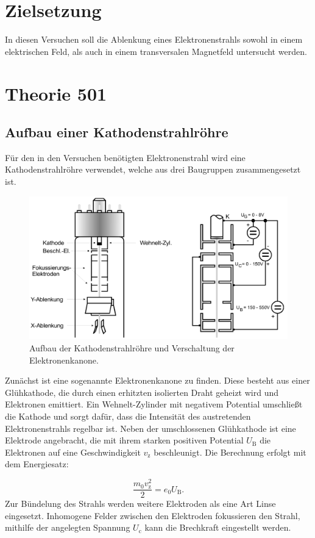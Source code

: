 \section{Zielsetzung}
In diesen Versuchen soll die Ablenkung eines Elektronenstrahls sowohl in einem elektrischen Feld, als auch in einem transversalen Magnetfeld untersucht werden.

\section{Theorie 501}
\subsection{Aufbau einer Kathodenstrahlröhre}
Für den in den Versuchen benötigten Elektronenstrahl wird eine Kathodenstrahlröhre verwendet, welche aus drei Baugruppen zusammengesetzt ist.

\begin{figure}[h!]
	\centering
	\includegraphics[width=0.9\linewidth]{kathodeaufbau.png}
	\caption{Aufbau der Kathodenstrahlröhre und Verschaltung der Elektronenkanone.}
	\label{fig:kathodeaufbau}
\end{figure}

Zunächst ist eine sogenannte Elektronenkanone zu finden. Diese besteht aus einer Glühkathode, die durch einen erhitzten isolierten Draht geheizt wird und Elektronen emittiert. Ein Wehnelt-Zylinder mit negativem
Potential umschließt die Kathode und sorgt dafür, dass die Intensität des austretenden Elektronenstrahls regelbar ist. Neben der umschlossenen Glühkathode ist eine Elektrode
angebracht, die mit ihrem starken positiven Potential $U_{\text{B}}$ die Elektronen auf eine Geschwindigkeit $v_{\text{z}}$ beschleunigt. Die Berechnung erfolgt mit dem Energiesatz:

\begin{equation}
\frac{m_0 v_{\text{z}}^2}{2} = e_0 U_{\text{B}}.
\label{eqn:energiesatz}
\end{equation}
Zur Bündelung des Strahls werden weitere Elektroden als eine Art Linse eingesetzt. Inhomogene Felder zwischen den Elektroden fokussieren den Strahl, mithilfe der angelegten Spannung $U_{\text{c}}$
kann die Brechkraft eingestellt werden. 

